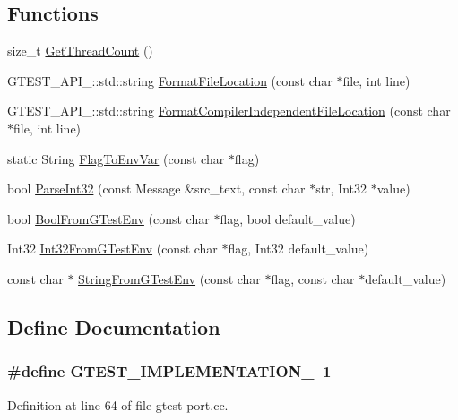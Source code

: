 \subsection*{\-Functions}
\begin{DoxyCompactItemize}
\item 
size\-\_\-t \hyperlink{namespacetesting_1_1internal_a1a64b279303ddd2280b7d7530f229daf}{\-Get\-Thread\-Count} ()
\item 
\-G\-T\-E\-S\-T\-\_\-\-A\-P\-I\-\_\-\-::std\-::string \hyperlink{namespacetesting_1_1internal_a6264f0605b7d7d0609eae663c58662c0}{\-Format\-File\-Location} (const char $\ast$file, int line)
\item 
\-G\-T\-E\-S\-T\-\_\-\-A\-P\-I\-\_\-\-::std\-::string \hyperlink{namespacetesting_1_1internal_ae75f0742876f6d9ba86daf5603bf2448}{\-Format\-Compiler\-Independent\-File\-Location} (const char $\ast$file, int line)
\item 
static \-String \hyperlink{namespacetesting_1_1internal_a45d22c9a68e205a0ec895a1e176fa0f5}{\-Flag\-To\-Env\-Var} (const char $\ast$flag)
\item 
bool \hyperlink{namespacetesting_1_1internal_a3bd151d0274b216f9c2e6275ccc4a9a3}{\-Parse\-Int32} (const \-Message \&src\-\_\-text, const char $\ast$str, \-Int32 $\ast$value)
\item 
bool \hyperlink{namespacetesting_1_1internal_af17bf74326e1076c47455ef2618c1a1a}{\-Bool\-From\-G\-Test\-Env} (const char $\ast$flag, bool default\-\_\-value)
\item 
\-Int32 \hyperlink{namespacetesting_1_1internal_a960e275ac93c373f223887e57ec54381}{\-Int32\-From\-G\-Test\-Env} (const char $\ast$flag, \-Int32 default\-\_\-value)
\item 
const char $\ast$ \hyperlink{namespacetesting_1_1internal_a0154be115eea16783f82d3642ff27940}{\-String\-From\-G\-Test\-Env} (const char $\ast$flag, const char $\ast$default\-\_\-value)
\end{DoxyCompactItemize}


\subsection{\-Define \-Documentation}
\hypertarget{gtest-port_8cc_a83bd232fd1077579fada92c31bb7469f}{
\subsubsection[{\-G\-T\-E\-S\-T\-\_\-\-I\-M\-P\-L\-E\-M\-E\-N\-T\-A\-T\-I\-O\-N\-\_\-}]{\setlength{\rightskip}{0pt plus 5cm}\#define {\bf \-G\-T\-E\-S\-T\-\_\-\-I\-M\-P\-L\-E\-M\-E\-N\-T\-A\-T\-I\-O\-N\-\_\-}~1}}\label{df/d09/gtest-port_8cc_a83bd232fd1077579fada92c31bb7469f}


\-Definition at line 64 of file gtest-\/port.\-cc.

